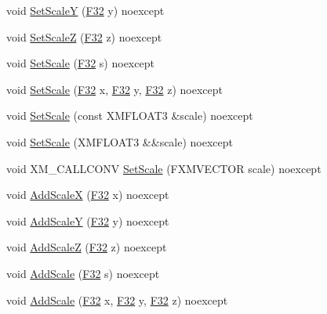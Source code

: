 \begin{DoxyCompactItemize}
\item 
void \hyperlink{classmage_1_1_transform_a953a89b7f7ed2ec47eb05074d43e35c6}{Set\+ScaleY} (\hyperlink{namespacemage_aa97e833b45f06d60a0a9c4fc22ae02c0}{F32} y) noexcept
\item 
void \hyperlink{classmage_1_1_transform_aa8fa7169c739cd1e005bbb373ccbf6c3}{Set\+ScaleZ} (\hyperlink{namespacemage_aa97e833b45f06d60a0a9c4fc22ae02c0}{F32} z) noexcept
\item 
void \hyperlink{classmage_1_1_transform_acf366489ae37e771e3f7b06c6452cb33}{Set\+Scale} (\hyperlink{namespacemage_aa97e833b45f06d60a0a9c4fc22ae02c0}{F32} s) noexcept
\item 
void \hyperlink{classmage_1_1_transform_a0a2d5430c745a27c5acaff472ba8b82e}{Set\+Scale} (\hyperlink{namespacemage_aa97e833b45f06d60a0a9c4fc22ae02c0}{F32} x, \hyperlink{namespacemage_aa97e833b45f06d60a0a9c4fc22ae02c0}{F32} y, \hyperlink{namespacemage_aa97e833b45f06d60a0a9c4fc22ae02c0}{F32} z) noexcept
\item 
void \hyperlink{classmage_1_1_transform_a815185ca44ff5d0d385ff919ee355e33}{Set\+Scale} (const X\+M\+F\+L\+O\+A\+T3 \&scale) noexcept
\item 
void \hyperlink{classmage_1_1_transform_a06ec78f9239c0f0663638359f4f3c3b8}{Set\+Scale} (X\+M\+F\+L\+O\+A\+T3 \&\&scale) noexcept
\item 
void X\+M\+\_\+\+C\+A\+L\+L\+C\+O\+NV \hyperlink{classmage_1_1_transform_a7dd2ca0ee43f956f1a6db79f83c14983}{Set\+Scale} (F\+X\+M\+V\+E\+C\+T\+OR scale) noexcept
\item 
void \hyperlink{classmage_1_1_transform_ae2f2f2109aca3c2c34ea1601d392e6a4}{Add\+ScaleX} (\hyperlink{namespacemage_aa97e833b45f06d60a0a9c4fc22ae02c0}{F32} x) noexcept
\item 
void \hyperlink{classmage_1_1_transform_a6f3dbff67c49f2d920c25d46cf25d0ee}{Add\+ScaleY} (\hyperlink{namespacemage_aa97e833b45f06d60a0a9c4fc22ae02c0}{F32} y) noexcept
\item 
void \hyperlink{classmage_1_1_transform_ae9aa81d2f6af6422a261878b63a0e5de}{Add\+ScaleZ} (\hyperlink{namespacemage_aa97e833b45f06d60a0a9c4fc22ae02c0}{F32} z) noexcept
\item 
void \hyperlink{classmage_1_1_transform_a3b90baf1db39dd3dc17a9203b4383073}{Add\+Scale} (\hyperlink{namespacemage_aa97e833b45f06d60a0a9c4fc22ae02c0}{F32} s) noexcept
\item 
void \hyperlink{classmage_1_1_transform_a9159be1589e53e93d50cf3dad60e7f75}{Add\+Scale} (\hyperlink{namespacemage_aa97e833b45f06d60a0a9c4fc22ae02c0}{F32} x, \hyperlink{namespacemage_aa97e833b45f06d60a0a9c4fc22ae02c0}{F32} y, \hyperlink{namespacemage_aa97e833b45f06d60a0a9c4fc22ae02c0}{F32} z) noexcept

\end{DoxyCompactItemize}
